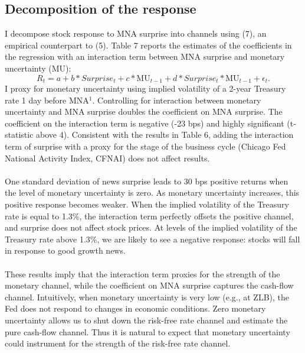 \documentclass[12pt]{article}
\begin{document}
\subsection{Decomposition of the response} \label{sec:Model}

I decompose stock response to MNA surprise into channels using (7), an empirical counterpart to (5). Table 7 reports the estimates of the coefficients in the regression with an interaction term between MNA surprise and monetary uncertainty (MU):
\begin{equation}
    R_t = a + b*Surprise_t + c*\text{MU}_{t-1} + d*Surprise_t*\text{MU}_{t-1} + \epsilon_t.
\end{equation}
I proxy for monetary uncertainty using implied volatility of a 2-year Treasury rate 1 day before MNA$^1$. Controlling for interaction between monetary uncertainty and MNA surprise doubles the coefficient on MNA surprise. The coefficient on the interaction term is negative (-23 bps) and highly significant (t-statistic above 4). Consistent with the results in Table 6, adding the interaction term of surprise with a proxy for the stage of the business cycle (Chicago Fed National Activity Index, CFNAI) does not affect results.
\paragraph{}
One standard deviation of news surprise leads to 30 bps positive returns when the level of monetary uncertainty is zero. As monetary uncertainty increases, this positive response becomes weaker. When the implied volatility of the Treasury rate is equal to 1.3\%, the interaction term perfectly offsets the positive channel, and surprise does not affect stock prices. At levels of the implied volatility of the Treasury rate above 1.3\%, we are likely to see a negative response: stocks will fall in response to good growth news. 
\paragraph{}
These results imply that the interaction term proxies for the strength of the monetary channel, while the coefficient on MNA surprise captures the cash-flow channel. Intuitively, when monetary uncertainty is very low (e.g., at ZLB), the Fed does not respond to changes in economic conditions. Zero monetary uncertainty allows us to shut down the risk-free rate channel and estimate the pure cash-flow channel. Thus it is natural to expect that monetary uncertainty could instrument for the strength of the risk-free rate channel.
\end{document}
